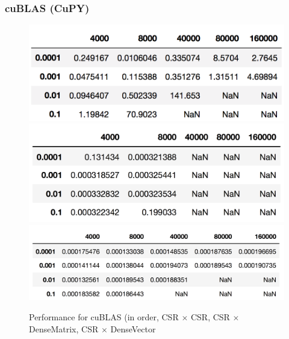 \documentclass[12pt]{article}
\begin{document}
\subsubsection{cuBLAS (CuPY)}
\begin{figure}[h]
  \caption{Performance for cuBLAS (in order, CSR $\times$ CSR, CSR $\times$ DenseMatrix, CSR $\times$ DenseVector}
  \includegraphics[scale = 0.24]{csr_x_csr_cublas.png}
  \includegraphics[scale = 0.25]{csr_x_densematrix_cublas.png}
  \includegraphics[scale = 0.23]{csr_x_densevector_cublas.png}
\end{figure}
\end{document}
